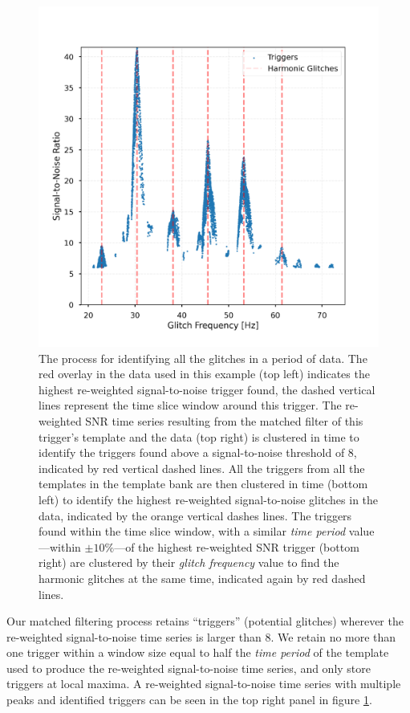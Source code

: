\begin{figure}
\begin{minipage}[t]{1.0\linewidth}
        \hspace{0.01\linewidth}
        \includegraphics[width=0.49\linewidth]{images/4_archenemy/Section3/3.5/cluster_in_frequency.pdf}
      \end{minipage}
    \caption{The process for identifying all the \scladj glitches in a period of \gwadj data. The red overlay in the \gwadj data used in this example (top left) indicates the highest re-weighted signal-to-noise trigger found, the dashed vertical lines represent the time slice window around this trigger. The re-weighted SNR time series resulting from the matched filter of this trigger's template and the data (top right) is clustered in time to identify the triggers found above a signal-to-noise threshold of $8$, indicated by red vertical dashed lines. All the triggers from all the templates in the template bank are then clustered in time (bottom left) to identify the highest re-weighted signal-to-noise glitches in the data, indicated by the orange vertical dashes lines. The triggers found within the time slice window, with a similar \emph{time period} value---within $\pm 10\%$---of the highest re-weighted SNR trigger (bottom right) are clustered by their \emph{glitch frequency} value to find the harmonic glitches at the same time, indicated again by red dashed lines.}
    \label{4:fig:clustering_story}
\end{figure}

Our matched filtering process retains ``triggers'' (potential \scladj glitches) wherever the re-weighted signal-to-noise time series is larger than 8. We retain no more than one trigger within a window size equal to half the \emph{time period} of the template used to produce the re-weighted signal-to-noise time series, and only store triggers at local maxima. A re-weighted signal-to-noise time series with multiple peaks and identified triggers can be seen in the top right panel in figure \ref{4:fig:clustering_story}.

